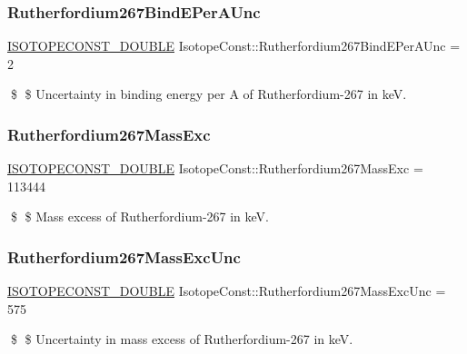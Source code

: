\subsubsection{\texorpdfstring{Rutherfordium267\+Bind\+E\+Per\+A\+Unc}{Rutherfordium267BindEPerAUnc}}
{\footnotesize\ttfamily \mbox{\hyperlink{group___isotope_const-_macros_ga8f45a7272ce02c0b4c65c44636ed719a}{I\+S\+O\+T\+O\+P\+E\+C\+O\+N\+S\+T\+\_\+\+D\+O\+U\+B\+LE}} Isotope\+Const\+::\+Rutherfordium267\+Bind\+E\+Per\+A\+Unc = 2}

\$ \$ Uncertainty in binding energy per A of Rutherfordium-\/267 in keV. \mbox{\label{group___isotope_const-_rutherfordium-_rf267_gaf36e4e20044ea66ae6f69b3e1996a544}} 
\subsubsection{\texorpdfstring{Rutherfordium267\+Mass\+Exc}{Rutherfordium267MassExc}}
{\footnotesize\ttfamily \mbox{\hyperlink{group___isotope_const-_macros_ga8f45a7272ce02c0b4c65c44636ed719a}{I\+S\+O\+T\+O\+P\+E\+C\+O\+N\+S\+T\+\_\+\+D\+O\+U\+B\+LE}} Isotope\+Const\+::\+Rutherfordium267\+Mass\+Exc = 113444}

\$ \$ Mass excess of Rutherfordium-\/267 in keV. \mbox{\label{group___isotope_const-_rutherfordium-_rf267_ga8072934e9f495afc1e87cdd363f7393c}} 
\subsubsection{\texorpdfstring{Rutherfordium267\+Mass\+Exc\+Unc}{Rutherfordium267MassExcUnc}}
{\footnotesize\ttfamily \mbox{\hyperlink{group___isotope_const-_macros_ga8f45a7272ce02c0b4c65c44636ed719a}{I\+S\+O\+T\+O\+P\+E\+C\+O\+N\+S\+T\+\_\+\+D\+O\+U\+B\+LE}} Isotope\+Const\+::\+Rutherfordium267\+Mass\+Exc\+Unc = 575}

\$ \$ Uncertainty in mass excess of Rutherfordium-\/267 in keV. \mbox{\label{group___isotope_const-_rutherfordium-_rf267_ga76c5cb625ec39455ed3629c70caba364}} 

